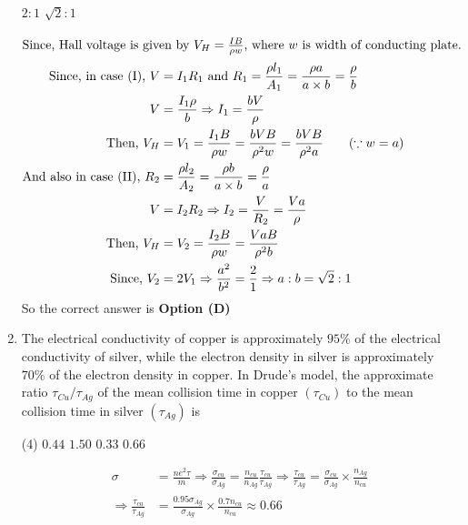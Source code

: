 \begin{enumerate}
\begin{tasks}
		\task[\textbf{C.}] $2: 1$
		\task[\textbf{D.}] $\sqrt{2}: 1$
	\end{tasks}
	\begin{answer}
		\begin{align*}
		\intertext{Since, Hall voltage is given by $V_{H}=\frac{I B}{\rho w}$, where $w$ is width of conducting plate.}
		\text{Since, in case (I), }V&=I_{1} R_{1}\text{ and }R_{1}=\frac{\rho l_{1}}{A_{1}}=\frac{\rho a}{a \times b}=\frac{\rho}{b}\\
		V&=\frac{I_{1} \rho}{b} \Rightarrow I_{1}=\frac{b V}{\rho}\\
		\text{Then, }V_{H}&=V_{1}=\frac{I_{1} B}{\rho w}=\frac{b V B}{\rho^{2} w}=\frac{b V B}{\rho^{2} a}
		\qquad(\because w=a)\\
		\text{And also in case (II), }R_{2}&=\frac{\rho l_{2}}{A_{2}}=\frac{\rho b}{a \times b}=\frac{\rho}{a}\\
		V&=I_{2} R_{2} \Rightarrow I_{2}=\frac{V}{R_{2}}=\frac{V a}{\rho}\\
		\text{Then, }V_{H}&=V_{2}=\frac{I_{2} B}{\rho w}=\frac{V a B}{\rho^{2} b}\\
		\text{Since, }V_{2}&=2 V_{1} \Rightarrow \frac{a^{2}}{b^{2}}=\frac{2}{1} \Rightarrow a: b=\sqrt{2}: 1
		\end{align*}
		So the correct answer is \textbf{Option (D)}
	\end{answer}
	\item The electrical conductivity of copper is approximately $95 \%$ of the electrical conductivity of silver, while the electron density in silver is approximately $70 \%$ of the electron density in copper. In Drude's model, the approximate ratio $\tau_{C u} / \tau_{A g}$ of the mean collision time in copper $\left(\tau_{C u}\right)$ to the mean collision time in silver $\left(\tau_{A g}\right)$ is
	{}
	\begin{tasks}(4)
		\task[\textbf{A.}] $0.44$
		\task[\textbf{B.}]  $1.50$
		\task[\textbf{C.}] $0.33$
		\task[\textbf{D.}]  $0.66$
	\end{tasks}
	\begin{answer}
		\begin{align*}
		\sigma&=\frac{n e^{2} \tau}{m} \Rightarrow \frac{\sigma_{c u}}{\sigma_{A g}}=\frac{n_{c u}}{n_{A g}} \frac{\tau_{c u}}{\tau_{A g}} \Rightarrow \frac{\tau_{c u}}{\tau_{A g}}=\frac{\sigma_{c u}}{\sigma_{A g}} \times \frac{n_{A g}}{n_{c u}}\\
		\Rightarrow \frac{\tau_{c u}}{\tau_{A g}}&=\frac{0.95 \sigma_{A g}}{\sigma_{A g}} \times \frac{0.7 n_{c u}}{n_{c u}} \approx 0.66

\end{align*}
\end{answer}
\end{enumerate}
